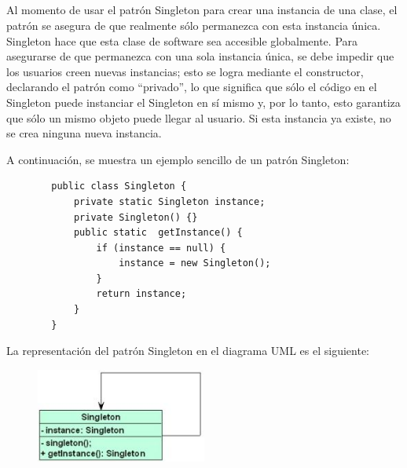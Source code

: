 \documentclass[10pt,a4paper]{article} %
\begin{document}
\subsection{}
{\large Al momento de usar el patr{\' o}n Singleton para crear una instancia de una clase, el patr{\' o}n se asegura de que realmente s{\' o}lo permanezca con esta instancia {\' u}nica. Singleton hace que esta clase de software sea accesible globalmente. Para asegurarse de que permanezca con una sola instancia {\' u}nica, se debe impedir que los usuarios creen nuevas instancias; esto se logra mediante el constructor, declarando el patr{\' o}n como ``privado'', lo que significa que s{\' o}lo el c{\' o}digo en el Singleton puede instanciar el Singleton en s{\' i} mismo y, por lo tanto, esto garantiza que s{\' o}lo un mismo objeto puede llegar al usuario. Si esta instancia ya existe, no se crea ninguna nueva instancia. 


\vspace{0.5cm}
A continuaci{\' o}n, se muestra un ejemplo sencillo de un patr{\' o}n Singleton:

    \begin{lstlisting}
        public class Singleton {
        	private static Singleton instance; 
        	private Singleton() {} 
        	public static  getInstance() { 
        		if (instance == null) { 
        			instance = new Singleton();
        		}
        		return instance;
        	}
        }
    \end{lstlisting} 


\vspace{0.5cm}
La representaci{\' o}n del patr{\' o}n Singleton en el diagrama UML es el siguiente:

    \begin{figure}[H]
    	\includegraphics[width=0.5\textwidth]{singletonUML.jpg}
        \centering
    	\label{img:SingletonUML}
     \end{figure}
    
}

\subsection{}
\end{document}
